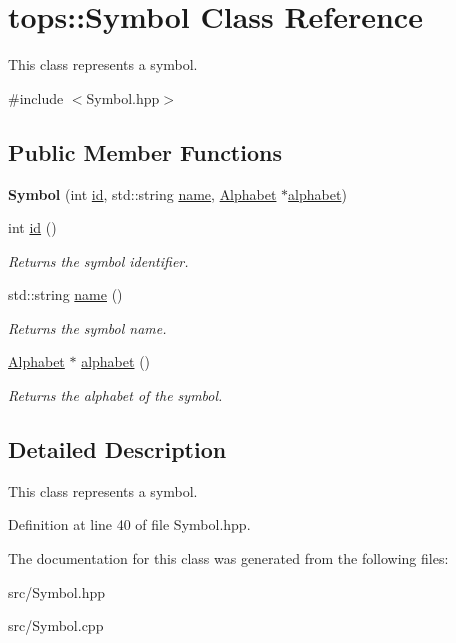 \hypertarget{classtops_1_1Symbol}{}\section{tops\+:\+:Symbol Class Reference}
\label{classtops_1_1Symbol}


This class represents a symbol.  




{\ttfamily \#include $<$Symbol.\+hpp$>$}

\subsection*{Public Member Functions}
\begin{DoxyCompactItemize}
\item 
\mbox{\label{classtops_1_1Symbol_afdf4eb2dbae534a86e9c485e37fe8ff9}} 
{\bfseries Symbol} (int \hyperlink{classtops_1_1Symbol_a9e0d958e5ea5f92b9d57762c3dc96444}{id}, std\+::string \hyperlink{classtops_1_1Symbol_a13d3f77b70a51587c5b538756078b137}{name}, \hyperlink{classtops_1_1Alphabet}{Alphabet} $\ast$\hyperlink{classtops_1_1Symbol_abed28c8e2c8eb56e93148d2f698fd125}{alphabet})
\item 
\mbox{\label{classtops_1_1Symbol_a9e0d958e5ea5f92b9d57762c3dc96444}} 
int \hyperlink{classtops_1_1Symbol_a9e0d958e5ea5f92b9d57762c3dc96444}{id} ()
\begin{DoxyCompactList}\small\item\em Returns the symbol identifier. \end{DoxyCompactList}\item 
\mbox{\label{classtops_1_1Symbol_a13d3f77b70a51587c5b538756078b137}} 
std\+::string \hyperlink{classtops_1_1Symbol_a13d3f77b70a51587c5b538756078b137}{name} ()
\begin{DoxyCompactList}\small\item\em Returns the symbol name. \end{DoxyCompactList}\item 
\mbox{\label{classtops_1_1Symbol_abed28c8e2c8eb56e93148d2f698fd125}} 
\hyperlink{classtops_1_1Alphabet}{Alphabet} $\ast$ \hyperlink{classtops_1_1Symbol_abed28c8e2c8eb56e93148d2f698fd125}{alphabet} ()
\begin{DoxyCompactList}\small\item\em Returns the alphabet of the symbol. \end{DoxyCompactList}\end{DoxyCompactItemize}


\subsection{Detailed Description}
This class represents a symbol. 

Definition at line 40 of file Symbol.\+hpp.



The documentation for this class was generated from the following files\+:\begin{DoxyCompactItemize}
\item 
src/Symbol.\+hpp\item 
src/Symbol.\+cpp\end{DoxyCompactItemize}
